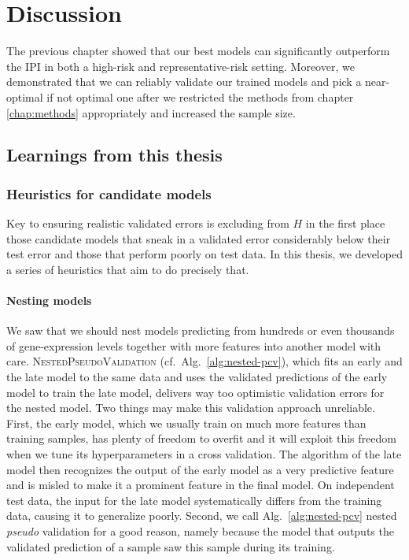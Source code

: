\chapter{Discussion} \label{chap:discussion}

The previous chapter showed that our best models can significantly outperform the IPI in both 
a high-risk and representative-risk setting. Moreover, we demonstrated that we can reliably validate 
our trained models and pick a near-optimal if not optimal one after we restricted the methods from 
chapter \ref{chap:methods} appropriately and increased the sample size.

\section{Learnings from this thesis}\label{sec:discussion-learning}

\subsection{Heuristics for candidate models}

Key to ensuring realistic validated errors is excluding from $H$ in the first place those candidate 
models that sneak in a validated error considerably below their test error and those that perform 
poorly on test data. In this thesis, we developed a series of heuristics that aim to do precisely 
that.

\subsubsection{Nesting models}

We saw that we should nest models predicting from hundreds or even thousands of 
gene-expression levels together with more features into another model with care. 
\textsc{NestedPseudoValidation} (cf.\ Alg.\ 
\ref{alg:nested-pcv}), which fits an early and the late model to the same data and uses the 
validated predictions of the early model to train the late model, delivers way too optimistic 
validation errors for the nested model. Two things may make this validation approach unreliable.
First, the early model, which we usually train
on much more features than training samples, has plenty of freedom to overfit and it will exploit this 
freedom when we tune its hyperparameters in a cross validation. The algorithm of the late model then 
recognizes the output of the early model as a very predictive feature and is misled to make it 
a prominent feature in the final model. On independent test data, the input for the late model 
systematically differs from the training data, causing it to generalize poorly. Second, we call Alg.\ 
\ref{alg:nested-pcv} nested \textit{pseudo} validation for a good reason, namely because the model 
that outputs the validated prediction of a sample saw this sample during its training. 

